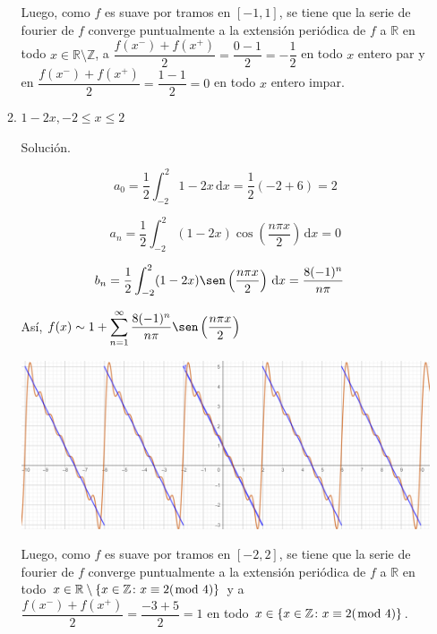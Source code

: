 \documentclass[fleqn]{article}
\newcommand{\real}{\mathbb{R}}
\newcommand{\ent}{\mathbb{Z}}
\newcommand{\intg}[3]{\int_{#1}^{#2} #3 \, \mathrm{d}x}
\begin{document}
\begin{enumerate}[I.]
\begin{enumerate}[(1)]
			Luego, como $f$ es suave por tramos en $ [-1,1] $, se tiene que la serie de fourier de $f$ converge puntualmente a la extensión periódica de $f$ a $ \real $ en todo $ x \in \real \setminus \ent $, a $ \dfrac{f(x^-) + f(x^+)}{2} = \dfrac{0-1}{2} = -\dfrac{1}{2} $ en todo $ x $ entero par y en $ \dfrac{f(x^-) + f(x^+)}{2} = \dfrac{1-1}{2} = 0 $ en todo $ x $ entero impar.


			\bfseries
			\item $ 1 - 2x, -2 \leq x \leq 2 $
			
			Solución.

			\normalfont

			\begin{equation*}
				a_0 = \dfrac{1}{2} \intg{-2}{2}{1 - 2x} = \dfrac{1}{2} (-2 + 6) = 2
			\end{equation*}

			\begin{equation*}
				a_n = \dfrac{1}{2} \intg{-2}{2}{(1 - 2x) \cos \left( \dfrac{n \pi x}{2} \right)} = 0
			\end{equation*}

			\begin{align*}
				b_n &= \dfrac{1}{2} \intg{-2}{2}{(1 - 2x) \sen \left( \dfrac{n \pi x}{2} \right)} = \dfrac{8(-1)^n}{n \pi}
			\end{align*}

			Así, $ \displaystyle f(x) \sim 1 + \sum_{n=1}^{\infty} \dfrac{8(-1)^n}{n \pi} \sen \left( \dfrac{n \pi x}{2} \right) $

			\includegraphics[width=0.95\linewidth]{Ejer3.png}

			Luego, como $f$ es suave por tramos en $ [-2,2] $, se tiene que la serie de fourier de $f$ converge puntualmente a la extensión periódica de $f$ a $ \real $ en todo $ x \in \real \setminus \{ x \in \ent \colon x \equiv 2 (\hspace{-2mm} \mod 4) \} $ y a $ \dfrac{f(x^-) + f(x^+)}{2} = \dfrac{-3+5}{2} = 1 $ en todo $ x \in \{ x \in \ent \colon x \equiv 2 (\hspace{-2mm} \mod 4) \} $.


\end{enumerate}
\end{enumerate}
\end{document}
